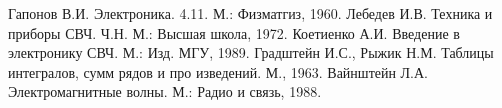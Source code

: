 \documentclass[a4paper,14pt]{extarticle}
\begin{document}

\begin{thebibliography}{}
    Гапонов В.И. Электроника. 4.11. М.: Физматгиз, 1960.
    Лебедев И.В. Техника и приборы СВЧ. Ч.Н. М.: Высшая школа, 1972.
    Коетиенко А.И. Введение в электронику СВЧ. М.: Изд. МГУ, 1989.
    Градштейн И.С., Рыжик Н.М. Таблицы интегралов, сумм рядов и про­
  изведений. М., 1963.
    Вайнштейн Л.А. Электромагнитные волны. М.: Радио и связь, 1988.
\end{thebibliography}
\end{document}

